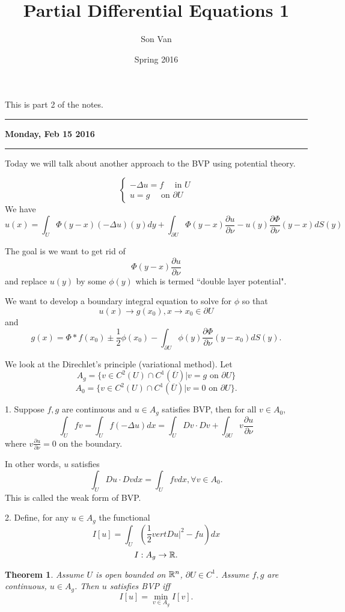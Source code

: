 \documentclass[11pt]{amsart}%
\title{Partial Differential Equations 1}
\author{Son Van}
\date{Spring 2016}
\newtheorem{theorem}{Theorem}
\begin{document}
\maketitle
This is part 2 of the notes.

\begin{center}\rule{0.5\linewidth}{\linethickness}\end{center}

\textbf{Monday, Feb 15 2016}

\begin{center}\rule{0.5\linewidth}{\linethickness}\end{center}

Today we will talk about another approach to the BVP using potential theory.

\[\begin{cases}
    -\Delta u=f \quad \text{ in }U\\
    u=g \quad \text{ on } \partial U
\end{cases}\]
We have
$$u(x)=\int_U \Phi(y-x)(-\Delta u)(y) dy + \int_{\partial U} \Phi(y-x)\frac{\partial u}{\partial \nu} -u(y)\frac{\partial \Phi}{\partial \nu}(y-x) dS(y)$$


The goal is we want to get rid of 
$$\Phi(y-x)\frac{\partial u}{\partial \nu}$$
and replace $u(y)$ by some $\phi(y)$ which is termed ``double layer potential".

We want to develop a boundary integral equation to solve for $\phi$ so that
$$u(x)\to g(x_0), x\to x_0 \in \partial U$$
and $$g(x)= \Phi * f(x_0) \pm \frac{1}{2}\phi(x_0) -\int_{\partial U} \phi(y)\frac{\partial \Phi}{\partial \nu} (y-x_0)dS(y).$$

We look at the Direchlet's principle (variational method). Let $$A_g=\{ v\in C^2(U)\cap C^1(\overline{U})| v= g \text{ on } \partial U\}$$
$$A_0 = \{ v\in C^2(U)\cap C^1(\overline{U})| v=0 \text{ on } \partial U\}.$$

1. Suppose $f,g$ are continuous and $u\in A_g$ satisfies BVP, then for all $v\in A_0$,
$$\int_U fv = \int_U f(-\Delta u) dx = \int_U Dv\cdot Dv + \int_{\partial U} v\frac{\partial u}{\partial \nu}$$ where $v\frac{\partial u}{\partial \nu}=0$ on the boundary. 

In other words, $u$ satisfies
$$\int_U Du\cdot Dv dx =\int_U fv dx, \forall v\in A_0.$$
This is called the weak form of BVP.

2. Define, for any $u\in A_g$ the functional
$$I[u] = \int_U(\frac{1}{2}vert Du\vert^2 -fu) dx$$
$$I: A_g \to \mathbb{R}.$$

\begin{theorem}
    Assume $U$ is open bounded on $\mathbb{R}^n$, $\partial U\in C^1$. Assume $f,g$ are continuous, $u\in A_g$. Then $u$ satisfies BVP iff
    \[ I[u]=\min_{v\in A_g} I[v]. \tag{*}\]
\end{theorem}
\end{document}
